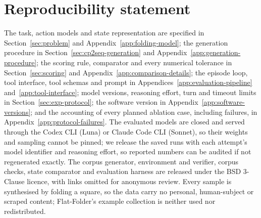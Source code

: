 \section*{Reproducibility statement}
\label{sec:licence}
\label{sec:reproducibility}
\providecommand{\artifactavailability}{with links omitted for anonymous review}

The task, action models and state representation are specified in Section~\ref{sec:problem} and
Appendix~\ref{app:folding-model}; the generation procedure in Section~\ref{sec:cp2seq-generation}
and Appendix~\ref{app:generation-procedure}; the scoring rule, comparator and every numerical
tolerance in Section~\ref{sec:scoring} and Appendix~\ref{app:comparison-details}; the episode
loop, tool interface, tool schemas and prompt in Appendices~\ref{app:evaluation-pipeline}
and~\ref{app:tool-interface}; model versions, reasoning effort, turn and timeout limits in
Section~\ref{sec:exp-protocol}; the software version in Appendix~\ref{app:software-versions};
and the accounting of every planned ablation case, including failures, in
Appendix~\ref{app:protocol-failures}. The evaluated models are closed and served through the
Codex CLI (Luna) or Claude Code CLI (Sonnet), so their weights and sampling cannot be pinned; we release the saved runs with each
attempt's model identifier and reasoning effort, so reported numbers can be audited if not
regenerated exactly. The corpus generator, environment and verifier, corpus
checks, state comparator and evaluation harness are released under the BSD 3-Clause licence,
\artifactavailability. Every sample is synthesised by folding a square, so the
data carry no personal, human-subject or scraped content; Flat-Folder's example collection is
neither used nor redistributed.
